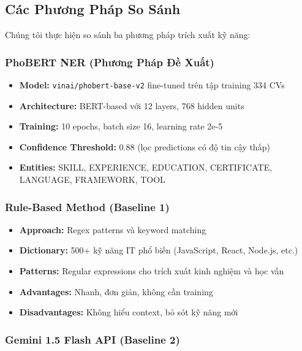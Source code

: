 \subsection{Các Phương Pháp So Sánh}

Chúng tôi thực hiện so sánh ba phương pháp trích xuất kỹ năng:

\subsubsection{PhoBERT NER (Phương Pháp Đề Xuất)}

\begin{itemize}
    \item \textbf{Model:} \texttt{vinai/phobert-base-v2} fine-tuned trên tập training 334 CVs
    \item \textbf{Architecture:} BERT-based với 12 layers, 768 hidden units
    \item \textbf{Training:} 10 epochs, batch size 16, learning rate 2e-5
    \item \textbf{Confidence Threshold:} 0.88 (lọc predictions có độ tin cậy thấp)
    \item \textbf{Entities:} SKILL, EXPERIENCE, EDUCATION, CERTIFICATE, LANGUAGE, FRAMEWORK, TOOL
\end{itemize}

\subsubsection{Rule-Based Method (Baseline 1)}

\begin{itemize}
    \item \textbf{Approach:} Regex patterns và keyword matching
    \item \textbf{Dictionary:} 500+ kỹ năng IT phổ biến (JavaScript, React, Node.js, etc.)
    \item \textbf{Patterns:} Regular expressions cho trích xuất kinh nghiệm và học vấn
    \item \textbf{Advantages:} Nhanh, đơn giản, không cần training
    \item \textbf{Disadvantages:} Không hiểu context, bỏ sót kỹ năng mới
\end{itemize}

\subsubsection{Gemini 1.5 Flash API (Baseline 2)}

